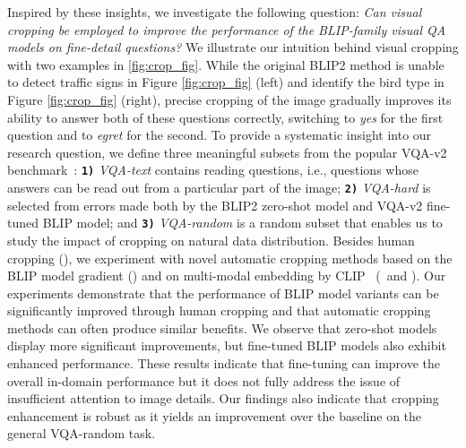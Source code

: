 

Inspired by these insights, we investigate the following question: \textit{Can visual cropping be employed to improve the performance of the BLIP-family visual QA models on fine-detail questions?} 
We illustrate our intuition behind visual cropping with two examples in \autoref{fig:crop_fig}.
While the original BLIP2 method is unable to detect traffic signs in Figure \ref{fig:crop_fig} (left) and identify the bird type in Figure \ref{fig:crop_fig} (right), precise cropping of the image gradually improves its ability to answer both of these questions correctly, switching to \textit{yes} for the first question and to \textit{egret} for the second. 
To provide a systematic insight into our research question, we define three meaningful subsets from the popular VQA-v2 benchmark~\citep{goyal2017making}: \texttt{\textbf{1)}} \textit{VQA-text} contains reading questions, i.e., questions whose answers can be read out from a particular part of the image; \texttt{\textbf{2)}}  \textit{VQA-hard} is selected from errors made both by the BLIP2 zero-shot model and VQA-v2 fine-tuned BLIP model; and \texttt{\textbf{3)}}  \textit{VQA-random} is a random subset that enables us to study the impact of cropping on natural data distribution.
Besides human cropping (\hc), we experiment with novel automatic cropping methods based on the BLIP model gradient (\grad) and on multi-modal embedding by CLIP~\citep{clip} (\sac~and \rac). %
Our experiments demonstrate that the performance of BLIP model variants can be significantly improved through human cropping and that automatic cropping methods can often produce similar benefits. We observe that zero-shot models display more significant improvements, but fine-tuned BLIP models also exhibit enhanced performance. These results indicate that fine-tuning can improve the overall in-domain performance but it does not fully address the issue of insufficient attention to image details. Our findings also indicate that cropping enhancement is robust as it yields an improvement over the baseline on the general VQA-random task.

